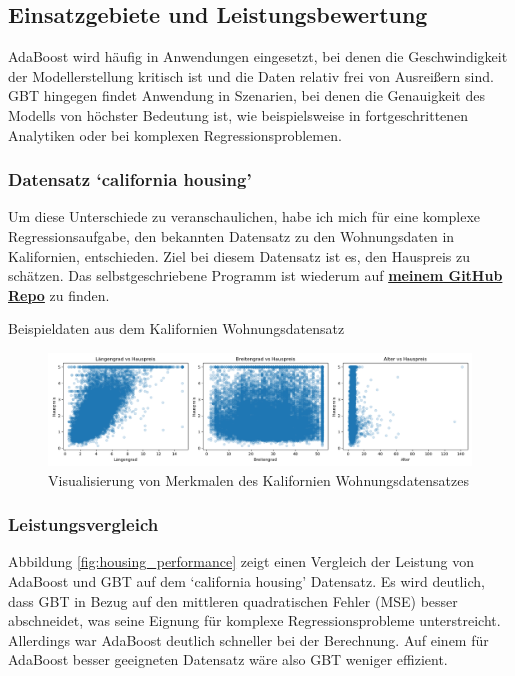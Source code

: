 \subsection{Einsatzgebiete und Leistungsbewertung}
AdaBoost wird häufig in Anwendungen eingesetzt, bei denen die Geschwindigkeit der Modellerstellung kritisch ist und die Daten relativ frei von Ausreißern sind. GBT hingegen findet Anwendung in Szenarien, bei denen die Genauigkeit des Modells von höchster Bedeutung ist, wie beispielsweise in fortgeschrittenen Analytiken oder bei komplexen Regressionsproblemen.

\subsubsection{Datensatz `california housing'}
Um diese Unterschiede zu veranschaulichen, habe ich mich für eine komplexe Regressionsaufgabe, den bekannten Datensatz zu den Wohnungsdaten in Kalifornien, entschieden. Ziel bei diesem Datensatz ist es, den Hauspreis zu schätzen. Das selbstgeschriebene Programm ist wiederum auf \textbf{\href{https://github.com/CodeLtDave/Boosting-Algorithms-ML-Seminararbeit/blob/main/python-env/VergleichAdaBoostGBT.ipynb}{meinem GitHub Repo}} zu finden.

\begin{table}[ht]
    \centering
    \caption{Beispieldaten aus dem Kalifornien Wohnungsdatensatz}
    \label{tab:housing_data}
    \resizebox{\textwidth}{!}{
    
    }
\end{table}
    

\begin{figure}[ht]
    \centering
    \includegraphics[width=\textwidth]{Images/housing_features.png}
    \caption{Visualisierung von Merkmalen des Kalifornien Wohnungsdatensatzes}
    \label{fig:housing_features}
\end{figure}

\subsubsection{Leistungsvergleich} \label{sec:performance_comparison}
Abbildung \ref{fig:housing_performance} zeigt einen Vergleich der Leistung von AdaBoost und GBT auf dem `california housing' Datensatz. Es wird deutlich, dass GBT in Bezug auf den mittleren quadratischen Fehler (MSE) besser abschneidet, was seine Eignung für komplexe Regressionsprobleme unterstreicht. Allerdings war AdaBoost deutlich schneller bei der Berechnung. Auf einem für AdaBoost besser geeigneten Datensatz wäre also GBT weniger effizient.

